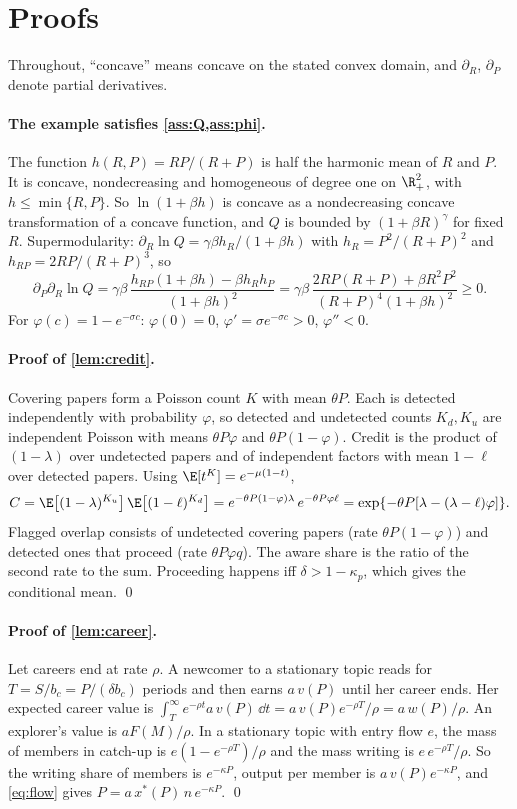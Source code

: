 \section{Proofs}\label{app:proofs}

Throughout, ``concave'' means concave on the stated convex domain, and
$\partial_R$, $\partial_P$ denote partial derivatives.

\paragraph{The example satisfies \cref{ass:Q,ass:phi}.} The function
$h(R,P)=RP/(R+P)$ is half the harmonic mean of $R$ and $P$. It is concave,
nondecreasing and homogeneous of degree one on $\R_+^2$, with $h\le\min\{R,P\}$.
So $\ln(1+\beta h)$ is concave as a nondecreasing concave transformation of a
concave function, and $Q$ is bounded by $(1+\beta R)^\gamma$ for fixed $R$.
Supermodularity: $\partial_R\ln Q=\gamma\beta h_R/(1+\beta h)$ with
$h_R=P^2/(R+P)^2$ and $h_{RP}=2RP/(R+P)^3$, so
\[
\partial_P\partial_R\ln Q=\gamma\beta\,\frac{h_{RP}(1+\beta h)-\beta h_Rh_P}{(1+\beta h)^2}
=\gamma\beta\,\frac{2RP(R+P)+\beta R^2P^2}{(R+P)^4(1+\beta h)^2}\ge0 .
\]
For $\varphi(c)=1-e^{-\sigma c}$: $\varphi(0)=0$, $\varphi'=\sigma e^{-\sigma c}>0$, $\varphi''<0$.

\paragraph{Proof of \cref{lem:credit}.} Covering papers form a Poisson count
$K$ with mean $\theta P$. Each is detected independently with probability
$\varphi$, so detected and undetected counts $K_d,K_u$ are independent Poisson
with means $\theta P\varphi$ and $\theta P(1-\varphi)$. Credit is the product
of $(1-\lambda)$ over undetected papers and of independent factors with mean
$1-\ell$ over detected papers. Using $\E[t^{K}]=e^{-\mu(1-t)}$,
\[
C=\E\big[(1-\lambda)^{K_u}\big]\,\E\big[(1-\ell)^{K_d}\big]
=e^{-\theta P(1-\varphi)\lambda}\,e^{-\theta P\varphi\ell}
=\exp\{-\theta P[\lambda-(\lambda-\ell)\varphi]\}.
\]
Flagged overlap consists of undetected covering papers (rate $\theta
P(1-\varphi)$) and detected ones that proceed (rate $\theta P\varphi q$). The
aware share is the ratio of the second rate to the sum. Proceeding happens iff
$\delta>1-\kappa_p$, which gives the conditional mean. \qed

\paragraph{Proof of \cref{lem:career}.} Let careers end at rate $\rho$. A
newcomer to a stationary topic reads for $T=S/b_c=P/(\delta b_c)$ periods and
then earns $a\,v(P)$ until her career ends. Her expected career value is
$\int_T^\infty e^{-\rho t}a\,v(P)\,\dd t=a\,v(P)e^{-\rho T}/\rho=a\,w(P)/\rho$.
An explorer's value is $aF(M)/\rho$. In a stationary topic with entry flow
$e$, the mass of members in catch-up is $e(1-e^{-\rho T})/\rho$ and the mass
writing is $e\,e^{-\rho T}/\rho$. So the writing share of members is
$e^{-\kappa P}$, output per member is $a\,v(P)e^{-\kappa P}$, and \eqref{eq:flow}
gives $P=a\,x^*(P)\,n\,e^{-\kappa P}$. \qed

